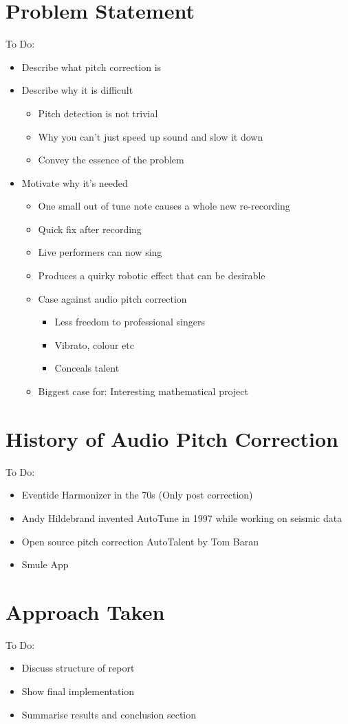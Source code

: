 
\section{Problem Statement}

\color{red}
To Do:
\begin{itemize}
	\item Describe what pitch correction is
	\item Describe why it is difficult
	\begin{itemize}
		\item Pitch detection is not trivial
		\item Why you can't just speed up sound and slow it down
		\item Convey the essence of the problem
	\end{itemize}
		\item Motivate why it's needed
		\begin{itemize}
		\item One small out of tune note causes a whole new re-recording
		\item Quick fix after recording
		\item Live performers can now sing
		\item Produces a quirky robotic effect that can be desirable
		\item Case against audio pitch correction
		\begin{itemize}
			\item Less freedom to professional singers
			\item Vibrato, colour etc
			\item Conceals talent
		\end{itemize}
		\item Biggest case for: Interesting mathematical project
	\end{itemize}
\end{itemize}
\color{black}

\section{History of Audio Pitch Correction}

\color{red}
To Do:
\begin{itemize}
	\item Eventide Harmonizer in the 70s (Only post correction)
	\item Andy Hildebrand invented AutoTune in 1997 while working on seismic data
	\item Open source pitch correction AutoTalent by Tom Baran
	\item Smule App
\end{itemize}
\color{black}

\section{Approach Taken}

\color{red}
To Do:
\begin{itemize}
	\item Discuss structure of report
	\item Show final implementation
	\item Summarise results and conclusion section
\end{itemize}
\color{black}
